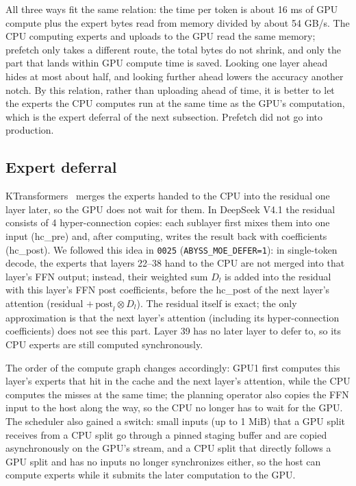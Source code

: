 \documentclass[11pt,a4paper]{article}
\newcommand{\code}[1]{\texttt{#1}}
\begin{document}
All three ways fit the same relation: the time per token is about 16 ms of GPU compute plus the expert bytes read from memory divided by about 54 GB/s. The CPU computing experts and uploads to the GPU read the same memory; prefetch only takes a different route, the total bytes do not shrink, and only the part that lands within GPU compute time is saved. Looking one layer ahead hides at most about half, and looking further ahead lowers the accuracy another notch. By this relation, rather than uploading ahead of time, it is better to let the experts the CPU computes run at the same time as the GPU's computation, which is the expert deferral of the next subsection. Prefetch did not go into production.
\subsection{Expert deferral}
\label{sec:defer}

KTransformers~\cite{ktrans} merges the experts handed to the CPU into the residual one layer later, so the GPU does not wait for them. In DeepSeek V4.1 the residual consists of 4 hyper-connection copies: each sublayer first mixes them into one input (hc\_pre) and, after computing, writes the result back with coefficients (hc\_post). We followed this idea in \code{0025} (\code{ABYSS\_MOE\_DEFER=1}): in single-token decode, the experts that layers 22--38 hand to the CPU are not merged into that layer's FFN output; instead, their weighted sum $D_l$ is added into the residual with this layer's FFN post coefficients, before the hc\_post of the next layer's attention (residual $+\,\mathrm{post}_l \otimes D_l$). The residual itself is exact; the only approximation is that the next layer's attention (including its hyper-connection coefficients) does not see this part. Layer 39 has no later layer to defer to, so its CPU experts are still computed synchronously.

The order of the compute graph changes accordingly: GPU1 first computes this layer's experts that hit in the cache and the next layer's attention, while the CPU computes the misses at the same time; the planning operator also copies the FFN input to the host along the way, so the CPU no longer has to wait for the GPU. The scheduler also gained a switch: small inputs (up to 1 MiB) that a GPU split receives from a CPU split go through a pinned staging buffer and are copied asynchronously on the GPU's stream, and a CPU split that directly follows a GPU split and has no inputs no longer synchronizes either, so the host can compute experts while it submits the later computation to the GPU.
\end{document}
